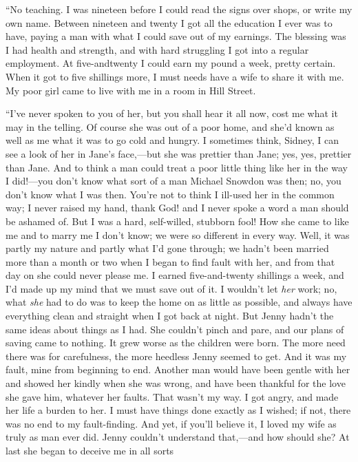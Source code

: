``No teaching. I was nineteen before I could read the signs over shops,
or write my own name. Between nineteen and twenty I got all the
education I ever was to have, paying a man with what I could save out of
my earnings. The blessing was I had health and strength, and with hard
struggling I got into a regular employment. At five-andtwenty I could
earn my pound a week, pretty certain. When it got to five shillings
more, I must needs have a wife to share it with me. My poor girl came to
live with me in a room in Hill Street.

``I've never spoken to you of her, but you {}shall hear it all now, cost
me what it may in the telling. Of course she was out of a poor home, and
she'd known as well as me what it was to go cold and hungry. I sometimes
think, Sidney, I can see a look of her in Jane's face,---but she was
prettier than Jane; yes, yes, prettier than Jane. And to think a man
could treat a poor little thing like her in the way I did!---you don't
know what sort of a man Michael Snowdon was then; no, you don't know
what I was then. You're not to think I ill-used her in the common way; I
never raised my hand, thank God! and I never spoke a word a man should
be ashamed of. But I was a hard, self-willed, stubborn fool! How she
came to like me and to marry me I don't know; we were so different in
every way. Well, it was partly my nature and partly what I'd gone
through; we hadn't been married more than a month or two when I began to
find fault with her, and from that day on she could never please me. I
earned five-and-twenty shillings a week, and I'd made up my mind that we
must save out of it. {}I wouldn't let \emph{her} work; no, what
\emph{she} had to do was to keep the home on as little as possible, and
always have everything clean and straight when I got back at night. But
Jenny hadn't the same ideas about things as I had. She couldn't pinch
and pare, and our plans of saving came to nothing. It grew worse as the
children were born. The more need there was for carefulness, the more
heedless Jenny seemed to get. And it was my fault, mine from beginning
to end. Another man would have been gentle with her and showed her
kindly when she was wrong, and have been thankful for the love she gave
him, whatever her faults. That wasn't my way. I got angry, and made her
life a burden to her. I must have things done exactly as I wished; if
not, there was no end to my fault-finding. And yet, if you'll believe
it, I loved my wife as truly as man ever did. Jenny couldn't understand
that,---and how should she? At last she began to deceive me in all sorts
